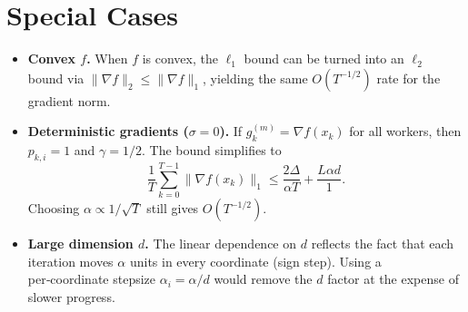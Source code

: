 \documentclass{article}
\begin{document}
\section*{Special Cases}
\begin{itemize}
\item \textbf{Convex $f$.}
When $f$ is convex, the $\ell_{1}$ bound can be turned into an $\ell_{2}$ bound
via $\|\nabla f\|_{2}\le \|\nabla f\|_{1}$, yielding the same $O(T^{-1/2})$ rate for the
gradient norm.
\item \textbf{Deterministic gradients ($\sigma=0$).}
If $g_k^{(m)}=\nabla f(x_k)$ for all workers, then $p_{k,i}=1$ and $\gamma=1/2$.
The bound simplifies to
\[
\frac{1}{T}\sum_{k=0}^{T-1}\|\nabla f(x_k)\|_{1}
\le
\frac{2\Delta}{\alpha T}+\frac{L\alpha d}{1}.
\]
Choosing $\alpha\propto 1/\sqrt{T}$ still gives $O(T^{-1/2})$.
\item \textbf{Large dimension $d$.}
The linear dependence on $d$ reflects the fact that each iteration moves
$\alpha$ units in every coordinate (sign step).  Using a per‑coordinate stepsize
$\alpha_i=\alpha/d$ would remove the $d$ factor at the expense of slower progress.
\end{itemize}
\end{document}
